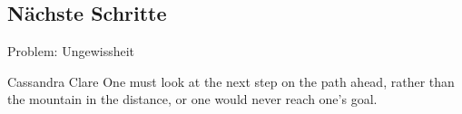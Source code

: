 %
%
%
%
%
%
%


\subsection{Nächste Schritte}


\begin{frame}[c]{Problem: Ungewissheit}
    \large
    \begin{aquote}{Cassandra Clare}
        One must look at the next step on the path ahead, rather than the
        mountain in the distance, or one would never reach one's goal.
    \end{aquote}
\end{frame}


